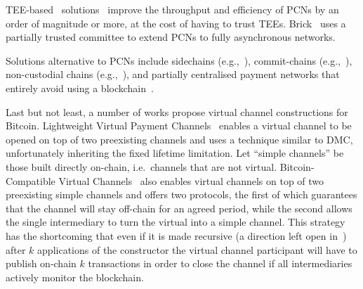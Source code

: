   TEE-based~\cite{zhao2019sok}
solutions~\cite{teechan,10.1145/3341301.3359627,DBLP:conf/asiaccs/LiaoZSS22,lee2020routee}
  improve the throughput and efficiency of PCNs by an order of magnitude or
  more, at the cost of having to trust TEEs. Brick~\cite{avarikioti2020brick}
  uses a partially trusted committee to extend PCNs to fully asynchronous
  networks.

  Solutions alternative to PCNs include side\-chains
  (e.g.,~\cite{BCDF+14,sidechains,KiaZin18}), commit-chains
  (e.g.,~\cite{plasma}), non-custo\-dial chains
  (e.g.,~\cite{plasma,konstantopoulos2019plasma,plasma-lower-bounds}),
  and partially centralised payment networks that entirely avoid using a
  blockchain~\cite{DBLP:conf/trust/ArmknechtKMYZ15,stellar,silentwhispers,DBLP:conf/ndss/RoosMKG18}.

  Last but not least, a number of works propose virtual channel constructions
  for Bitcoin. Lightweight Virtual Payment
  Channels~\cite{10.1007/978-3-030-65411-5_18} enables a virtual channel to be
  opened on top of two preexisting channels and uses a technique similar to DMC,
  unfortunately inheriting the fixed lifetime limitation.
  Let ``simple channels'' be those built directly on-chain, i.e.\ channels that are not
  virtual.
  Bitcoin-Compatible Virtual Channels~\cite{9519487} also enables
  virtual channels on top of two preexisting simple channels
  and offers two protocols, the first of which guarantees that the channel will
  stay off-chain for an agreed period, while the second allows the single intermediary
  to turn the virtual into a simple channel.
  This strategy has the shortcoming that even if it is made
  recursive (a direction left open in~\cite{9519487}) after $k$
  applications of the constructor the virtual channel participant will have to
  publish on-chain $k$ transactions in order to close the channel if all
  intermediaries actively monitor the blockchain.

